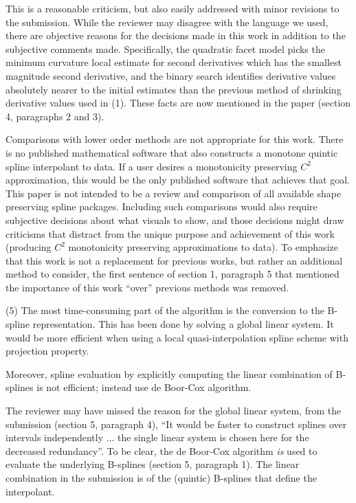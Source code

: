 This is a reasonable criticism, but also easily addressed with minor revisions to the submission. While the reviewer may disagree with the language we used, there are objective reasons for the decisions made in this work in addition to the subjective comments made. Specifically, the quadratic facet model picks the minimum curvature local estimate for second derivatives which has the smallest magnitude second derivative, and the binary search identifies derivative values absolutely nearer to the initial estimates than the previous method of shrinking derivative values used in (1). These facts are now mentioned in the paper (section 4, paragraphs 2 and 3).

Comparisons with lower order methods are not appropriate for this work. There is no published mathematical software that also constructs a monotone quintic spline interpolant to data. If a user desires a monotonicity preserving $C^2$ approximation, this would be the only published software that achieves that goal. This paper is not intended to be a review and comparison of all available shape preserving spline packages. Including such comparisons would also require subjective decisions about what visuals to show, and those decisions might draw criticisms that distract from the unique purpose and achievement of this work (producing $C^2$ monotonicity preserving approximations to data). To emphasize that this work is not a replacement for previous works, but rather an additional method to consider, the first sentence of section 1, paragraph 5 that mentioned the importance of this work ``over'' previous methods was removed.

{\parindent=20pt \it

\item{(5)} The most time-consuming part of the algorithm is the conversion to the B-spline representation. This has been done by solving a global linear system. It would be more efficient when using a local quasi-interpolation spline scheme with projection property.

\item{} Moreover, spline evaluation by explicitly computing the linear combination of B-splines is not efficient; instead use de Boor-Cox algorithm.

}

The reviewer may have missed the reason for the global linear system, from the submission (section 5, paragraph 4), ``It would be faster to construct splines over intervals independently ... the single linear system is chosen here for the decreased redundancy''. To be clear, the de Boor-Cox algorithm {\it is} used to evaluate the underlying B-splines (section 5, paragraph 1). The linear combination in the submission is of the (quintic) B-splines that define the interpolant.

